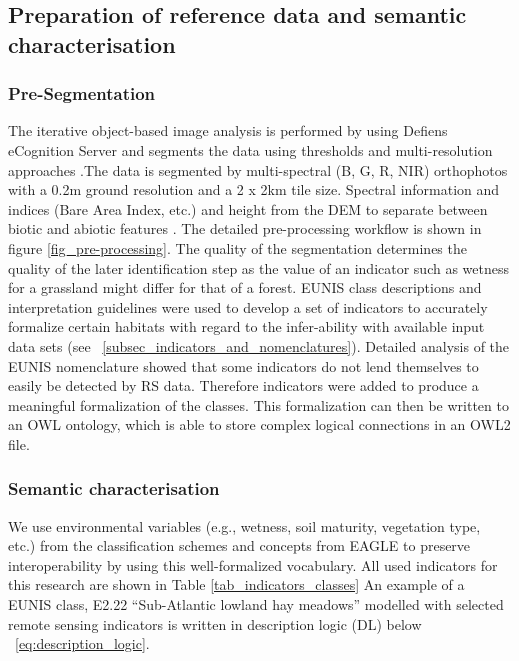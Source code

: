 \documentclass[authoryear, review,12pt,number]{elsarticle}
\begin{document}



\label{subsec_Preparation_of_reference_data_and_semantic_characterisation}
\subsection{Preparation of reference data and semantic characterisation}

\subsubsection{Pre-Segmentation} 
\label{subsec_segmentation}
The iterative object-based image analysis is performed by \cite{Tintrup2015} 
using Defiens eCognition Server and segments the data using thresholds and 
multi-resolution approaches \citep{baatz2001ecognition}.The data is segmented 
by multi-spectral (B, G, R, NIR) orthophotos with a 0.2m ground resolution and 
a 2 x 2km tile size. Spectral information and indices (Bare Area Index, etc.) and 
height from the DEM to separate between biotic and abiotic features 
\citep{Tintrup2015}. The detailed pre-processing workflow is 
shown in figure \ref{fig_pre-processing}. The quality of the segmentation
determines the quality of the later identification step as the value of an
indicator such as wetness for a grassland might differ for that of a forest.
EUNIS class descriptions and interpretation guidelines \citep{EUNISManual} were
used to develop a set of indicators to accurately formalize certain habitats
with regard to the infer-ability with available input data sets (see
~\ref{subsec_indicators_and_nomenclatures}). Detailed analysis of the EUNIS
nomenclature showed that some indicators do not lend themselves to easily be
detected by RS data. Therefore indicators were added to produce a meaningful
formalization of the classes.  This formalization can then be written to an OWL
ontology, which is able to store complex logical connections in an OWL2 file. 

\subsubsection{Semantic characterisation} 
\label{subsec_segmentation}
We use environmental variables (e.g., wetness, soil maturity, vegetation type,
etc.) from the classification schemes and concepts from EAGLE to preserve
interoperability by using this well-formalized vocabulary. All used indicators
for this research are shown in Table \ref{tab_indicators_classes} An example of
a EUNIS class, E2.22 ``Sub-Atlantic lowland hay meadows'' modelled with selected
remote sensing indicators is written in description logic (DL) below
~\ref{eq:description_logic}.
\end{document}
